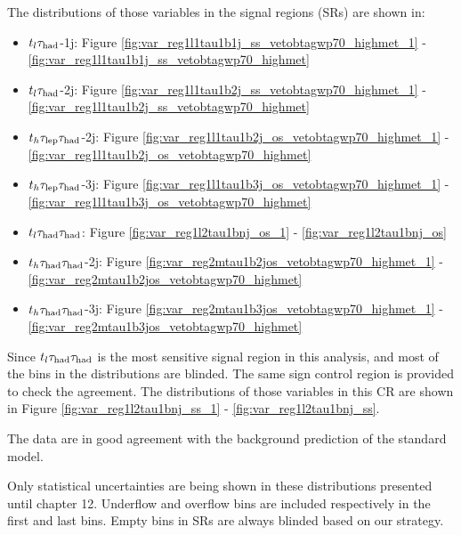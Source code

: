 \begin{enumerate}
The distributions of those variables in the signal regions (SRs) are shown in:
\begin{itemize}
	\item $t_l\tau_\text{had}$-1j: Figure  		\ref{fig:var_reg1l1tau1b1j_ss_vetobtagwp70_highmet_1}
								-	\ref{fig:var_reg1l1tau1b1j_ss_vetobtagwp70_highmet}
	\item $t_l\tau_\text{had}$-2j: Figure  		\ref{fig:var_reg1l1tau1b2j_ss_vetobtagwp70_highmet_1}
								-	\ref{fig:var_reg1l1tau1b2j_ss_vetobtagwp70_highmet}
	\item $t_h\tau_\text{lep}{}\tau_\text{had}$-2j: Figure 		\ref{fig:var_reg1l1tau1b2j_os_vetobtagwp70_highmet_1}
							 	-	\ref{fig:var_reg1l1tau1b2j_os_vetobtagwp70_highmet}
	\item $t_h\tau_\text{lep}{}\tau_\text{had}$-3j: Figure 		\ref{fig:var_reg1l1tau1b3j_os_vetobtagwp70_highmet_1}
								-	\ref{fig:var_reg1l1tau1b3j_os_vetobtagwp70_highmet}
	\item $t_l\tau_\text{had}{}\tau_\text{had}$: Figure 		\ref{fig:var_reg1l2tau1bnj_os_1}
								-	\ref{fig:var_reg1l2tau1bnj_os}
	\item $t_h\tau_\text{had}{}\tau_\text{had}$-2j: Figure 	\ref{fig:var_reg2mtau1b2jos_vetobtagwp70_highmet_1}
								-	\ref{fig:var_reg2mtau1b2jos_vetobtagwp70_highmet}
	\item $t_h\tau_\text{had}{}\tau_\text{had}$-3j: Figure 	\ref{fig:var_reg2mtau1b3jos_vetobtagwp70_highmet_1}
								-	\ref{fig:var_reg2mtau1b3jos_vetobtagwp70_highmet}
\end{itemize}

Since $t_l\tau_\text{had}{}\tau_\text{had}$  is the most sensitive signal region in this analysis, and most of the bins in the distributions are blinded. The same sign control region is provided to 
check the agreement. The distributions of those variables in this CR are shown in  Figure  \ref{fig:var_reg1l2tau1bnj_ss_1} -  \ref{fig:var_reg1l2tau1bnj_ss}.

The data are in good agreement with the background prediction of the standard model.

Only statistical uncertainties are being shown in these distributions presented until chapter 12. Underflow and overflow bins are included respectively in the first and last bins. Empty bins in SRs are always blinded based on our strategy.











\end{enumerate}
